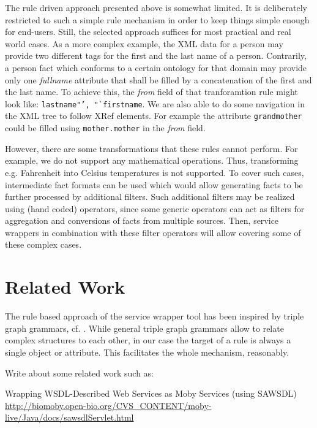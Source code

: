 \documentclass{fast_latex}
\begin{document}
The rule driven approach presented above is somewhat limited. It is deliberately restricted to such a simple rule mechanism in order to keep things simple enough for end-users. Still, the selected approach suffices for most practical and real world cases. As a more complex example, the XML data for a person may provide two different tags for the first and the last name of a person. Contrarily, a person fact which conforms to a certain ontology for that domain may provide only one \emph{fullname} attribute that shall be filled by a concatenation of the first and the last name. To achieve this, the \textit{from} field of that tranforamtion rule might look like: \texttt{lastname"', "`firstname}. We are also able to do some navigation in the XML tree to follow XRef elements. For example the attribute \texttt{grandmother} could be filled using \texttt{mother.mother} in the \textit{from} field. 

However, there are some transformations that these rules cannot perform. For example, we do not support any mathematical operations. Thus, transforming e.g. Fahrenheit into Celsius temperatures is not supported. To cover such  cases, intermediate fact formats can be used which would allow generating facts to be further processed by additional filters. Such additional filters may be realized using (hand coded) operators, since some generic operators can act as filters for aggregation and conversions of facts from multiple sources. Then, service wrappers in combination with these filter operators will allow covering some of these complex cases.



\clearpage
\section{Related Work} %
\label{sec:related_work}

The rule based approach of the service wrapper tool has been inspired by triple graph grammars, cf. \cite{Schurr94,JSZ97c}. While general triple graph grammars allow to relate complex structures to each other, in our case the target of a rule is always a single object or attribute. This facilitates the whole mechanism, reasonably. 

Write about some related work such as:

Wrapping WSDL-Described Web Services as Moby Services (using SAWSDL)
\url{http://biomoby.open-bio.org/CVS_CONTENT/moby-live/Java/docs/sawsdlServlet.html}
\end{document}
